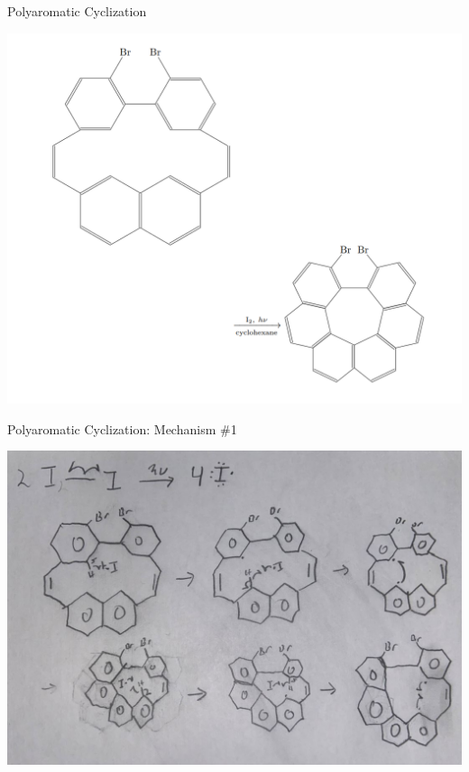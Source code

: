 \documentclass[notes]{beamer}
\begin{document}
\begin{frame}{Polyaromatic Cyclization}
\begin{center}
    \includegraphics[scale=.43]{polyaromatic_cyclization_overall.PNG}
\end{center}
\end{frame}

\begin{frame}{Polyaromatic Cyclization: Mechanism \#1}
\begin{center}
    \includegraphics[scale=.36]{polyaromatic_cyclization_one.JPG}
\end{center}
\end{frame}
\end{document}
